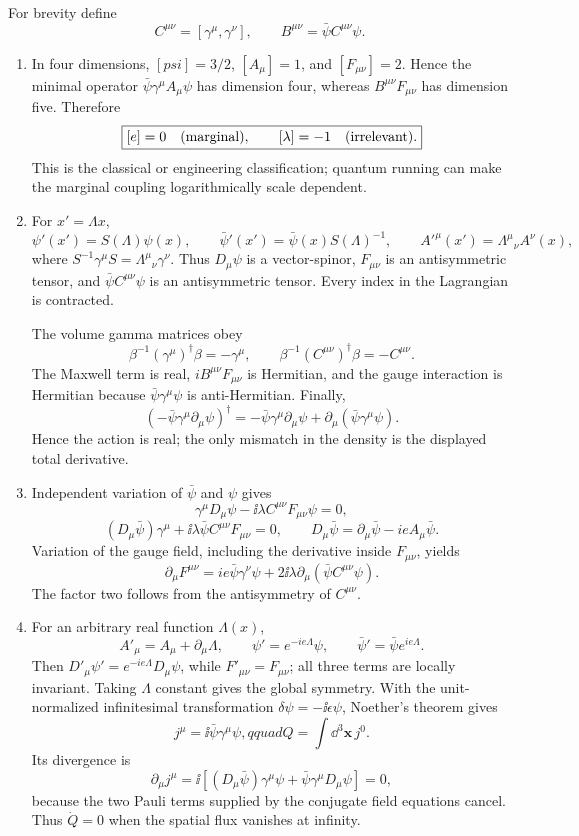 \begin{enumerate}
For brevity define
\[
 C^{\mu\nu}=[\gamma^\mu,\gamma^\nu],
 \qquad B^{\mu\nu}=\bar\psi C^{\mu\nu}\psi.
\]
\begin{enumerate}
\item
In four dimensions,
\([psi]=3/2\), \([A_\mu]=1\), and \([F_{\mu\nu}]=2\).  Hence the
minimal operator \(\bar\psi\gamma^\mu A_\mu\psi\) has dimension four,
whereas \(B^{\mu\nu}F_{\mu\nu}\) has dimension five.  Therefore
\[
 \boxed{[e]=0\quad\hbox{(marginal)},\qquad
 [\lambda]=-1\quad\hbox{(irrelevant)}.}
\]
This is the classical or engineering classification; quantum running can
make the marginal coupling logarithmically scale dependent.
\item
For \(x'=\Lambda x\),
\[
 \psi'(x')=S(\Lambda)\psi(x),\qquad
 \bar\psi'(x')=\bar\psi(x)S(\Lambda)^{-1},\qquad
 A'^\mu(x')=\Lambda^\mu{}_{\nu}A^\nu(x),
\]
where
\(S^{-1}\gamma^\mu S=\Lambda^\mu{}_{\nu}\gamma^\nu\).
Thus \(D_\mu\psi\) is a vector-spinor, \(F_{\mu\nu}\) is an
antisymmetric tensor, and \(\bar\psi C^{\mu\nu}\psi\) is an
antisymmetric tensor.  Every index in the Lagrangian is contracted.

The volume gamma matrices obey
\[
 \beta^{-1}(\gamma^\mu)^\dagger\beta=-\gamma^\mu,
 \qquad
 \beta^{-1}(C^{\mu\nu})^\dagger\beta=-C^{\mu\nu}.
\]
The Maxwell term is real, \(iB^{\mu\nu}F_{\mu\nu}\) is Hermitian, and
the gauge interaction is Hermitian because
\(\bar\psi\gamma^\mu\psi\) is anti-Hermitian.  Finally,
\[
 \left(-\bar\psi\gamma^\mu\partial_\mu\psi\right)^\dagger
 =-\bar\psi\gamma^\mu\partial_\mu\psi
 +\partial_\mu(\bar\psi\gamma^\mu\psi).
\]
Hence the action is real; the only mismatch in the density is the displayed
total derivative.
\item
Independent variation of \(\bar\psi\) and \(\psi\) gives
\[
 \boxed{
 \gamma^\mu D_\mu\psi-\ii\lambda C^{\mu\nu}F_{\mu\nu}\psi=0,}
\]
\[
 \boxed{
 (D_\mu\bar\psi)\gamma^\mu
 +\ii\lambda\bar\psi C^{\mu\nu}F_{\mu\nu}=0,}
 \qquad
 D_\mu\bar\psi=\partial_\mu\bar\psi-ieA_\mu\bar\psi.
\]
Variation of the gauge field, including the derivative inside
\(F_{\mu\nu}\), yields
\[
 \boxed{
 \partial_\mu F^{\mu\nu}
 =ie\bar\psi\gamma^\nu\psi
 +2\ii\lambda\partial_\mu
 \left(\bar\psi C^{\mu\nu}\psi\right).}
\]
The factor two follows from the antisymmetry of \(C^{\mu\nu}\).
\item
For an arbitrary real function \(\Lambda(x)\),
\[
 A'_\mu=A_\mu+\partial_\mu\Lambda,
 \qquad
 \psi'=e^{-ie\Lambda}\psi,
 \qquad
 \bar\psi'=\bar\psi e^{ie\Lambda}.
\]
Then \(D'_\mu\psi'=e^{-ie\Lambda}D_\mu\psi\), while
\(F'_{\mu\nu}=F_{\mu\nu}\); all three terms are locally invariant.
Taking \(\Lambda\) constant gives the global symmetry.  With the
unit-normalized infinitesimal transformation
\(\delta\psi=-\ii\epsilon\psi\), Noether's theorem gives
\[
 \boxed{j^\mu=\ii\bar\psi\gamma^\mu\psi,qquad
 Q=\int \dd^3\mathbf x\,j^0.}
\]
Its divergence is
\[
 \partial_\mu j^\mu
 =\ii\left[(D_\mu\bar\psi)\gamma^\mu\psi
 +\bar\psi\gamma^\mu D_\mu\psi\right]=0,
\]
because the two Pauli terms supplied by the conjugate field equations
cancel.  Thus \(\dot Q=0\) when the spatial flux vanishes at infinity.


\end{enumerate}
\end{enumerate}
